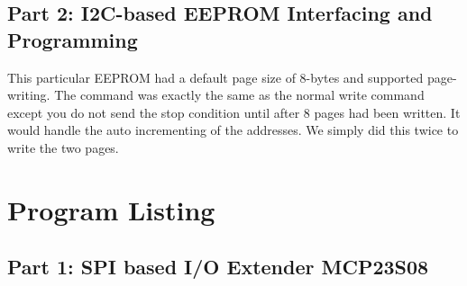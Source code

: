 \documentclass{article}
\begin{document}
	\subsection*{Part 2: I2C-based EEPROM Interfacing and Programming}
	This particular EEPROM had a default page size of 8-bytes and supported page-writing. The command was exactly the same as the normal write command except you do not send the stop condition until after 8 pages had been written. It would handle the auto incrementing of the addresses. We simply did this twice to write the two pages. 
	\section*{Program Listing}
	\subsection*{Part 1: SPI based I/O Extender MCP23S08}
\end{document}
